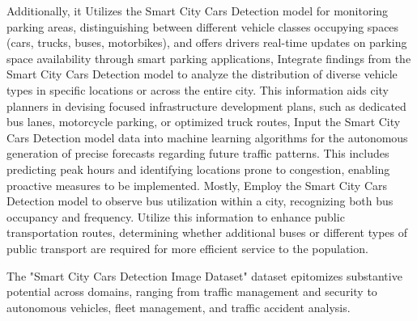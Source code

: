 Additionally, it Utilizes the Smart City Cars Detection model for monitoring parking areas, distinguishing between different vehicle classes occupying spaces (cars, trucks, buses, motorbikes), and offers drivers real-time updates on parking space availability through smart parking applications, Integrate findings from the Smart City Cars Detection model to analyze the distribution of diverse vehicle types in specific locations or across the entire city. This information aids city planners in devising focused infrastructure development plans, such as dedicated bus lanes, motorcycle parking, or optimized truck routes, Input the Smart City Cars Detection model data into machine learning algorithms for the autonomous generation of precise forecasts regarding future traffic patterns. This includes predicting peak hours and identifying locations prone to congestion, enabling proactive measures to be implemented. Mostly, Employ the Smart City Cars Detection model to observe bus utilization within a city, recognizing both bus occupancy and frequency. Utilize this information to enhance public transportation routes, determining whether additional buses or different types of public transport are required for more efficient service to the population.

The "Smart City Cars Detection Image Dataset" dataset epitomizes substantive potential across domains, ranging from traffic management and security to autonomous vehicles, fleet management, and traffic accident analysis.\cite{p4p-cars_dataset}

